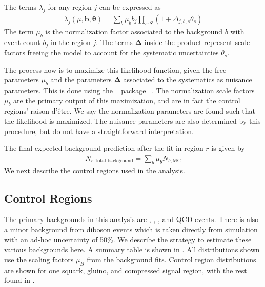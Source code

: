 The terms $\lambda_j$ for any region $j$ can be expressed as
\begin{align}
\lambda_j( \mu, \bm{b},\bm{\theta}) = \sum_b \mu_b \xspace b_j \xspace \prod_{s\epsilon S} \xspace (1 + \Delta_{j,b,s} \theta_s)
\end{align}
The term $\mu_b$ is the normalization factor associated to the background $b$ with event count $b_j$ in the region $j$.
The terms $\bm{\Delta}$ inside the product represent scale factors freeing the model to account for the systematic uncertainties $\theta_s$.

The process now is to maximize this likelihood function, given the free parameters $\mu_b$ and the parameters $\bm{\Delta}$ associated to the systematics as nuisance parameters.
This is done using the \histfitter~ package ~\cite{Baak:2014wma}.
The normalization scale factors $\mu_b$ are the primary output of this maximization, and are in fact the control regions' raison d'\^{e}tre.
We say the normalization parameters are found such that the likelihood is maximized.
The nuisance parameters are also determined by this procedure, but do not have a straightforward interpretation.

The final expected background prediction after the fit in region $r$ is given by
\begin{align}
N_{r,\text{total background}} = \sum_b \mu_b N_{b, \text{MC}}
\end{align}
We next describe the control regions used in the analysis.

\subsection{Control Regions}

The primary backgrounds in this analysis are \zjets, \wjets, \ttbar, and QCD events.
There is also a minor background from diboson events which is taken directly from simulation with an ad-hoc uncertainty of 50\%.
We describe the strategy to estimate these various backgrounds here.
A summary table is shown in .
All distributions shown use the scaling factors $\mu_B$ from the background fits.
Control region distributions are shown for one squark, gluino, and compressed signal region, with the rest found in .

